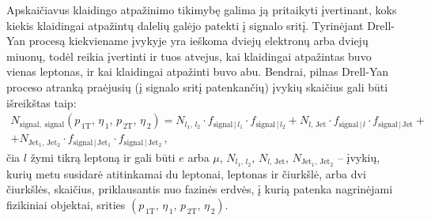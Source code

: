 \documentclass[a4paper, 12pt, oneside]{article}
\newlength\q
\begin{document}
Apskaičiavus klaidingo atpažinimo tikimybę galima ją pritaikyti įvertinant, koks kiekis klaidingai atpažintų dalelių galėjo patekti į signalo
sritį.
Tyrinėjant Drell-Yan procesą kiekviename įvykyje yra ieškoma dviejų elektronų arba dviejų miuonų, todėl reikia įvertinti ir tuos atvejus, kai
klaidingai atpažintas buvo vienas leptonas, ir kai klaidingai atpažinti buvo abu.
Bendrai, pilnas Drell-Yan proceso atranką praėjusių (į signalo sritį patenkančių) įvykių skaičius gali būti išreikštas taip:
\begin{multline}
	\label{eq:realfake}
	N_{\mathrm{signal, \; signal}}(p_{\,\mathrm{1T}}, \, \eta_{\, 1}, \, p_{\,\mathrm{2T}}, \, \eta_{\, 2}) =
	N_{l_1, \, l_2} \cdot 
	f_{\mathrm{signal} \,| \,l_1} \cdot f_{\mathrm{signal} \,| \, l_2} +
	N_{l, \, \mathrm{Jet}} \cdot 
	f_{\mathrm{signal} \,| \, l} \cdot f_{\mathrm{signal} \,| \,\mathrm{Jet}} + \\ +
	N_{\mathrm{Jet_1, \, Jet_2}} \cdot 
	f_{\mathrm{signal} \,| \,\mathrm{Jet_1}}\cdot f_{\mathrm{signal} \,| \,\mathrm{Jet_2}}\, ,
\end{multline}
čia $l$ žymi tikrą leptoną ir gali būti $e$ arba $\mu$, $N_{l_1, \, l_2}$, $N_{l, \, \mathrm{Jet}}$, $N_{\mathrm{Jet_1, \, Jet_2}}$ -- įvykių,
kurių metu susidarė atitinkamai du leptonai, leptonas ir čiurkšlė, arba dvi čiurkšlės, skaičius, priklausantis nuo fazinės erdvės, į kurią patenka
nagrinėjami fizikiniai objektai, srities $(p_{\,\mathrm{1T}}, \, \eta_{\, 1}, \, p_{\,\mathrm{2T}}, \, \eta_{\, 2})$.
\end{document}
